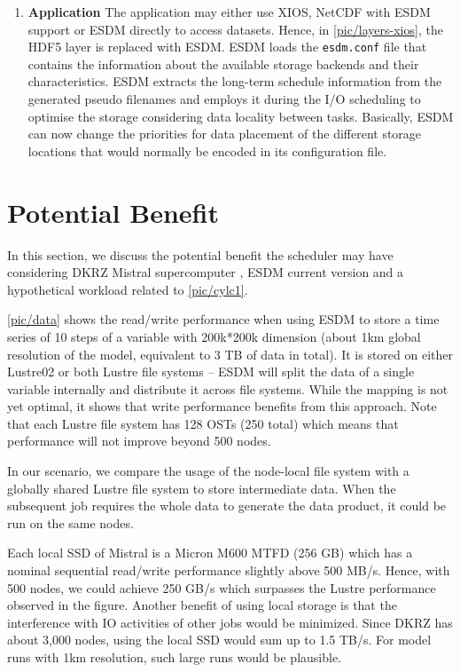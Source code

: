 \documentclass{superfri}
\begin{document}
\begin{enumerate}
  \item \textbf{Application}
  The application may either use XIOS, NetCDF with ESDM support or ESDM directly to access datasets.
  Hence, in \cref{pic/layers-xios}, the HDF5 layer is replaced with ESDM.
  ESDM loads the \texttt{esdm.conf} file that contains the information about the available storage backends and their characteristics.
  ESDM extracts the long-term schedule information from the generated pseudo filenames and employs it during the I/O scheduling to optimise the storage considering data locality between tasks.
  Basically, ESDM can now change the priorities for data placement of the different storage locations that would normally be encoded in its configuration file.
\end{enumerate}

\section{Potential Benefit}
\label{sec:evaluation}

In this section, we discuss the potential benefit the scheduler may have considering DKRZ Mistral supercomputer , ESDM current version and a hypothetical workload related to \cref{pic/cylc1}.


\cref{pic/data} shows the read/write performance when using ESDM to store a time series of 10 steps of a variable with 200k*200k dimension (about 1km global resolution of the model, equivalent to 3 TB of data in total). It is stored on either Lustre02 or both Lustre file systems -- ESDM will split the data of a single variable internally and distribute it across file systems. While the mapping is not yet optimal, it shows that write performance benefits from this approach. Note that each Lustre file system has 128 OSTs (250 total) which means that performance will not improve beyond 500 nodes.


In our scenario, we compare the usage of the node-local file system with a globally shared Lustre file system to store intermediate data. When the subsequent job requires the whole data to generate the data product, it could be run on the same nodes.

Each local SSD of Mistral is a Micron M600 MTFD (256 GB) which has a nominal sequential read/write performance slightly above 500 MB/s. Hence, with 500 nodes, we could achieve 250 GB/s which surpasses the Lustre performance observed in the figure. Another benefit of using local storage is that the interference with IO activities of other jobs would be minimized. Since DKRZ has about 3,000 nodes, using the local SSD would sum up to 1.5 TB/s. For model runs with 1km resolution, such large runs would be plausible.
\end{document}
